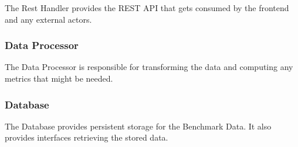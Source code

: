 The Rest Handler provides the \gls{REST API} that gets consumed by the frontend and any external actors.

\subsubsection*{Data Processor}

The Data Processor is responsible for transforming the data and computing any metrics that might be needed.

\subsubsection*{Database}

The Database provides persistent storage for the Benchmark Data. It also provides interfaces retrieving the stored data.
